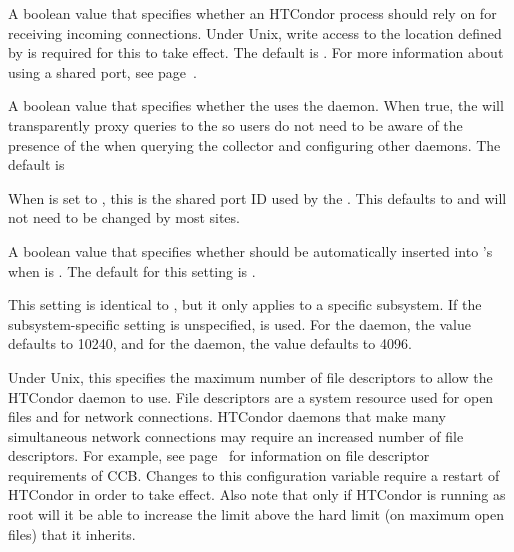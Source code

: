 \begin{description}
\label{param:UseSharedPort}
\item[\Macro{USE\_SHARED\_PORT}] A boolean value that
  specifies whether an HTCondor process should rely on
   for receiving incoming connections.  
  Under Unix, write access to the location defined by 
   is required for this to take
  effect.  The default is .
  For more information about using
  a shared port, see page~\pageref{sec:Config-shared-port}.

\label{param:CollectorUsesSharedPort}
\item[\Macro{COLLECTOR\_USES\_SHARED\_PORT}] A boolean value that
  specifies whether the  uses the 
  daemon.  When true, the  will transparently
  proxy queries to the  so users do not need to be aware of
  the presence of the  when querying the collector
  and configuring other daemons.  The default is 

\label{param:SharedPortDefaultId}
\item[\Macro{SHARED\_PORT\_DEFAULT\_ID}] When 
  is set to , this is the shared port ID used by the .
  This defaults to  and will not need to be changed by most sites.

\label{param:AutoIncludeSharedPortInDaemonList}
\item[\Macro{AUTO\_INCLUDE\_SHARED\_PORT\_IN\_DAEMON\_LIST}] A boolean
  value that specifies whether  should be
  automatically inserted into 's 
  when  is .  The default for this
  setting is .

\label{param:SubsysMaxFileDescriptors}
\item[\MacroB{<SUBSYS>\_MAX\_FILE\_DESCRIPTORS}]
This setting is identical to , but it
only applies to a specific subsystem.  If the
subsystem-specific setting is unspecified, 
is used.
For the  daemon, the value defaults to 10240, and
for the  daemon, the value defaults to 4096.

\label{param:MaxFileDescriptors}
\item[\Macro{MAX\_FILE\_DESCRIPTORS}] Under Unix, this specifies the
maximum number of file descriptors to allow the HTCondor daemon to use.
File descriptors are a system resource used for open files and for
network connections.  HTCondor daemons that make many simultaneous
network connections may require an increased number of file
descriptors.  For example, see page~\pageref{sec:CCB} for information
on file descriptor requirements of CCB.  Changes to this configuration
variable require a restart of HTCondor in order to take effect.  Also note
that only if HTCondor is running as root will it be able to increase the
limit above the hard limit (on maximum open files) that it inherits.


\end{description}
